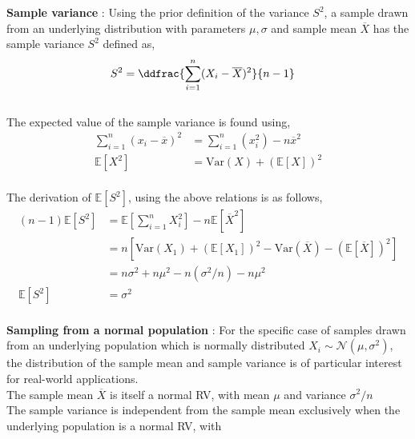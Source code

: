 \textbf{Sample variance} : Using the prior definition of the variance $ S^2 $, a sample drawn from an underlying distribution with parameters $ \mu, \sigma $ and sample mean $ \overline{X} $ has the sample variance $ S^2 $ defined as,\\

\begin{align}
	S^2 &= \ddfrac{\sum\limits_{i=1}^{n}(X_i - \overline{X})^2}{n-1}
\end{align}\\

The expected value of the sample variance is found using, \\

\begin{align}
	\sum\limits_{i=1}^{n}(x_i - \overline{x})^2 &= \sum\limits_{i=1}^{n}(x_i^2) - n\overline{x}^2 \nonumber \\
	\mathbb{E}[X^2] &= \mathrm{Var}(X) + (\mathbb{E}[X])^2 \nonumber 
\end{align}\\

The derivation of $ \mathbb{E}[S^2] $, using the above relations is as follows,\\

\begin{align}
	(n-1)\mathbb{E}[S^2] &= \mathbb{E}\left[\sum\limits_{i=1}^{n}X_i^2\right] - n\mathbb{E}[\overline{X}^2] \nonumber \\
	&= n\left[\mathrm{Var}(X_1) + (\mathbb{E}[X_1])^2 - \mathrm{Var}(\overline{X}) - (\mathbb{E}[\overline{X}])^2\right] \nonumber \\
	&= n\sigma^2 + n\mu^2 - n(\sigma^2/n) - n\mu^2 \nonumber \\
	\mathbb{E}[S^2] &= \sigma^2
\end{align} \\

\textbf{Sampling from a normal population} : For the specific case of samples drawn from an underlying population which is normally distributed $ X_i \sim \mathcal{N}(\mu, \sigma^2) $, the distribution of the sample mean and sample variance is of particular interest for real-world applications.\\

The sample mean $ \overline{X} $ is itself a normal RV, with mean $ \mu $ and variance $ \sigma^2 / n $ \\

The sample variance is independent from the sample mean exclusively when the underlying population is a normal RV, with \\

